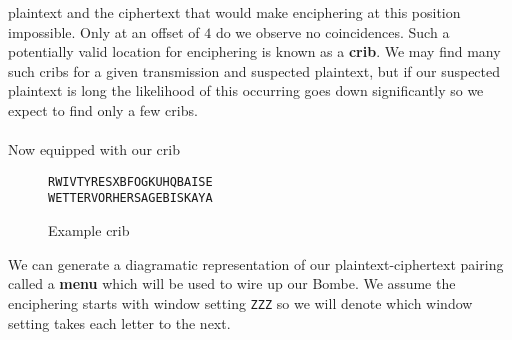 plaintext and the ciphertext that would make enciphering at this
position impossible. Only at an offset of $4$ do we observe no
coincidences. Such a potentially valid location for enciphering is
known as a {\bf{crib}}. We may find many such cribs for a given
transmission and suspected plaintext, but if our suspected plaintext
is long the likelihood of this occurring goes down significantly so
we expect to find only a few cribs.
\\\\Now equipped with our crib
\begin{figure}[H]
	\begin{center}
		\texttt{RWIVTYRESXBFOGKUHQBAISE}  \\
		\texttt{WETTERVORHERSAGEBISKAYA} \\
	\end{center}
	\caption{Example crib}
	\label{fig:crib}
\end{figure}
\noindent We can generate a diagramatic representation of our
plaintext-ciphertext pairing called a {\bf{menu}} which will be used
to wire up our Bombe. We assume the enciphering starts with window
setting \texttt{ZZZ} so we will denote which window setting takes
each letter to the next.

